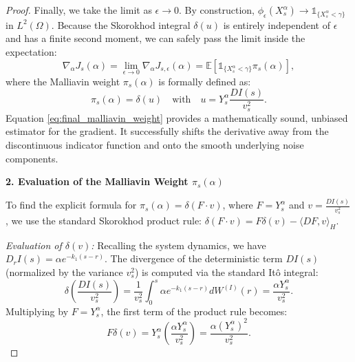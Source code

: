 \documentclass[11pt]{article}
\begin{document}
\begin{proof}
Finally, we take the limit as $\epsilon \to 0$. By construction, $\phi_\epsilon(X_s^\alpha) \to \mathds{1}_{\{X_s^\alpha < \gamma\}}$ in $L^2(\Omega)$. Because the Skorokhod integral $\delta(u)$ is entirely independent of $\epsilon$ and has a finite second moment, we can safely pass the limit inside the expectation:
\begin{equation}\label{eq:final_malliavin_weight}
    \nabla_\alpha J_s(\alpha) = \lim_{\epsilon \to 0} \nabla_\alpha J_{s,\epsilon}(\alpha) = \mathbb{E} \left[ \mathds{1}_{\{X_s^\alpha < \gamma\}} \pi_s(\alpha) \right],
\end{equation}
where the Malliavin weight $\pi_s(\alpha)$ is formally defined as:
\begin{equation}
    \pi_s(\alpha) = \delta(u) \quad \text{with} \quad u = Y_s^\alpha \frac{DI(s)}{v_s^2}.
\end{equation}
Equation \eqref{eq:final_malliavin_weight} provides a mathematically sound, unbiased estimator for the gradient. It successfully shifts the derivative away from the discontinuous indicator function and onto the smooth underlying noise components.

\textbf{2. Evaluation of the Malliavin Weight $\pi_s(\alpha)$}

To find the explicit formula for $\pi_s(\alpha) = \delta(F \cdot v)$, where $F = Y_s^\alpha$ and $v = \frac{DI(s)}{v_s^2}$, we use the standard Skorokhod product rule: $\delta(F \cdot v) = F \delta(v) - \langle DF, v \rangle_H$.

\textit{Evaluation of $\delta(v)$:} 
Recalling the system dynamics, we have $D_r I(s) = \alpha e^{-k_1(s-r)}$. The divergence of the deterministic term $DI(s)$ (normalized by the variance $v_s^2$) is computed via the standard Itô integral:
\begin{equation}
    \delta\left( \frac{D I(s)}{v_s^2} \right) = \frac{1}{v_s^2} \int_0^s \alpha e^{-k_1(s-r)} dW^{(I)}(r) = \frac{\alpha Y_s^\alpha}{v_s^2}.
\end{equation}
Multiplying by $F = Y_s^\alpha$, the first term of the product rule becomes:
\begin{equation}
    F \delta(v) = Y_s^\alpha \left( \frac{\alpha Y_s^\alpha}{v_s^2} \right) = \frac{\alpha (Y_s^\alpha)^2}{v_s^2}.
\end{equation}


\end{proof}
\end{document}
